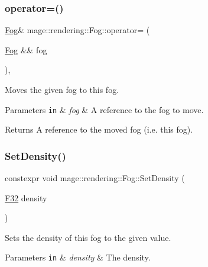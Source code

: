 \subsubsection{\texorpdfstring{operator=()}{operator=()}\hspace{0.1cm}{\footnotesize\ttfamily [2/2]}}
{\footnotesize\ttfamily \mbox{\hyperlink{classmage_1_1rendering_1_1_fog}{Fog}}\& mage\+::rendering\+::\+Fog\+::operator= (\begin{DoxyParamCaption}\item[{\mbox{\hyperlink{classmage_1_1rendering_1_1_fog}{Fog}} \&\&}]{fog }\end{DoxyParamCaption})\hspace{0.3cm}{\ttfamily [default]}, {\ttfamily [noexcept]}}

Moves the given fog to this fog.


\begin{DoxyParams}[1]{Parameters}
\mbox{\tt in}  & {\em fog} & A reference to the fog to move. \\
\hline
\end{DoxyParams}
\begin{DoxyReturn}{Returns}
A reference to the moved fog (i.\+e. this fog). 
\end{DoxyReturn}
\mbox{\label{classmage_1_1rendering_1_1_fog_a9b498c71c58e28bd58b09e4385338a13}} 
\subsubsection{\texorpdfstring{Set\+Density()}{SetDensity()}}
{\footnotesize\ttfamily constexpr void mage\+::rendering\+::\+Fog\+::\+Set\+Density (\begin{DoxyParamCaption}\item[{\mbox{\hyperlink{namespacemage_aa97e833b45f06d60a0a9c4fc22ae02c0}{F32}}}]{density }\end{DoxyParamCaption})\hspace{0.3cm}{\ttfamily [noexcept]}}

Sets the density of this fog to the given value.


\begin{DoxyParams}[1]{Parameters}
\mbox{\tt in}  & {\em density} & The density. \\
\hline
\end{DoxyParams}


